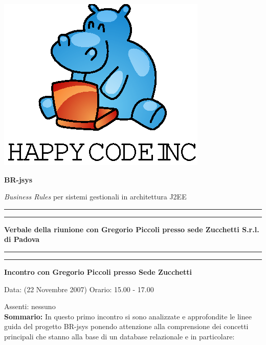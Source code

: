 \documentclass[11pt,titlepage,a4paper]{report}
\begin{document}
\begin{titlepage}
\begin{center}
\vspace*{0.5in}
\includegraphics{logo.eps}
\vspace*{0.2in}

{\Large \textbf{BR-jsys}}

{\Large \emph{Business Rules} per sistemi gestionali in architettura J2EE } 
\vspace{1.3in}
\par\rule{10cm}{.4pt} \par
\par\rule{12cm}{1pt} \par
\vspace*{0.5in}
\LARGE \textbf { Verbale della riunione con Gregorio Piccoli presso sede Zucchetti S.r.l. di Padova}
\vspace*{0.5in}
\par\rule{12cm}{1pt} \par
\par\rule{10cm}{.4pt} \par

\end{center}
\end{titlepage}
\vspace*{0.5in}

\thispagestyle{plain}
 \textbf{ Incontro con Gregorio Piccoli presso Sede Zucchetti  }

Data: (22 Novembre 2007) Orario: 15.00 - 17.00

Assenti: nessuno\\



\textbf{Sommario:}
In questo primo incontro si sono analizzate e approfondite le linee guida 
del progetto BR-jsys ponendo attenzione alla comprensione dei concetti principali 
che stanno alla base di un database relazionale e in particolare:
\end{document}
